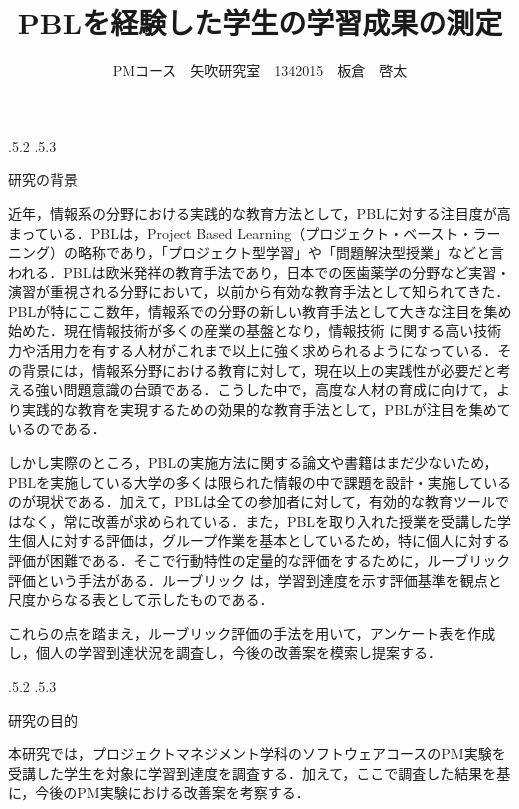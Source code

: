 \documentclass[uplatex]{jsarticle}
\title{\vspace{-14mm}PBLを経験した学生の学習成果の測定}
\author{PMコース　矢吹研究室　1342015　板倉　啓太}
\date{}%
\makeatletter
\renewcommand{\section}{%
    \if@slide\clearpage\fi
    \@startsection{section}{1}{\z@}%
    {\Cvs \@plus.5\Cdp \@minus.2\Cdp}%
    {.5\Cvs \@plus.3\Cdp}%
    {\normalfont\raggedright}}
\makeatother
\begin{document}
\maketitle





\section{研究の背景}

近年，情報系の分野における実践的な教育方法として，\cite{PBL}\cite{PBL1}PBLに対する注目度が高まっている．PBLは，Project Based Learning（プロジェクト・ベースト・ラーニング）の略称であり，「プロジェクト型学習」や「問題解決型授業」などと言われる．PBLは欧米発祥の教育手法であり，日本での医歯薬学の分野など実習・演習が重視される分野において，以前から有効な教育手法として知られてきた．PBLが特にここ数年，情報系での分野の新しい教育手法として大きな注目を集め始めた．現在情報技術が多くの産業の基盤となり，情報技術 に関する高い技術力や活用力を有する人材がこれまで以上に強く求められるようになっている．その背景には，情報系分野における教育に対して，現在以上の実践性が必要だと考える強い問題意識の台頭である．こうした中で，高度な人材の育成に向けて，より実践的な教育を実現するための効果的な教育手法として，PBLが注目を集めているのである．

しかし実際のところ，PBLの実施方法に関する論文や書籍はまだ少ないため，PBLを実施している大学の多くは限られた情報の中で課題を設計・実施しているのが現状である．加えて，PBLは全ての参加者に対して，有効的な教育ツールではなく，常に改善が求められている．また，PBLを取り入れた授業を受講した学生個人に対する評価は，グループ作業を基本としているため，特に個人に対する評価が困難である．そこで行動特性の定量的な評価をするために，\cite{ルーブリック評価}ルーブリック評価という手法がある．ルーブリック は，学習到達度を示す評価基準を観点と尺度からなる表として示したものである．

これらの点を踏まえ，ルーブリック評価の手法を用いて，アンケート表を作成し，個人の学習到達状況を調査し，今後の改善案を模索し提案する．




\section{研究の目的}

本研究では，プロジェクトマネジメント学科のソフトウェアコースのPM実験を受講した学生を対象に学習到達度を調査する．加えて，ここで調査した結果を基に，今後のPM実験における改善案を考察する．
\end{document}
